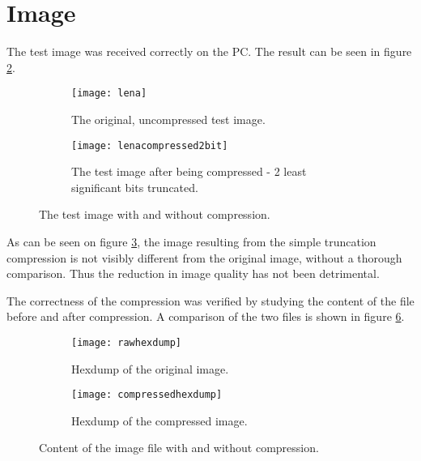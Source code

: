 \section{Image}

The test image was received correctly on the PC. 
The result can be seen in figure \ref{fig:compressedlena}.

\begin{figure}[H]
\centering
\begin{subfigure}{.5\textwidth}
  \centering
  \texttt{[image: lena]}
  \caption{The original, uncompressed test image.}
  \label{fig:lena}
\end{subfigure}%
\begin{subfigure}{.5\textwidth}
  \centering
  \texttt{[image: lenacompressed2bit]}
  \caption{The test image after being  compressed - 2 least significant bits truncated.}
  \label{fig:compressedlena}
\end{subfigure}
\caption{The test image with and without compression.}
\label{fig:lenacomp}
\end{figure}

As can be seen on figure \ref{fig:lenacomp}, the image resulting from the simple truncation compression is not visibly different from the original image, without a thorough comparison. 
Thus the reduction in image quality has not been detrimental.

The correctness of the compression was verified by studying the content of the file before and after compression. 
A comparison of the two files is shown in figure \ref{fig:hexlenacomp}. 

\begin{figure}[H]
\centering
\begin{subfigure}{.5\textwidth}
  \centering
  \texttt{[image: rawhexdump]}
  \caption{Hexdump of the original image.}
  \label{fig:lenahex}
\end{subfigure}%
\begin{subfigure}{.5\textwidth}
  \centering
  \texttt{[image: compressedhexdump]}
  \caption{Hexdump of the compressed image.}
  \label{fig:compressedlenahex}
\end{subfigure}
\caption{Content of the image file with and without compression.}
\label{fig:hexlenacomp}
\end{figure}

